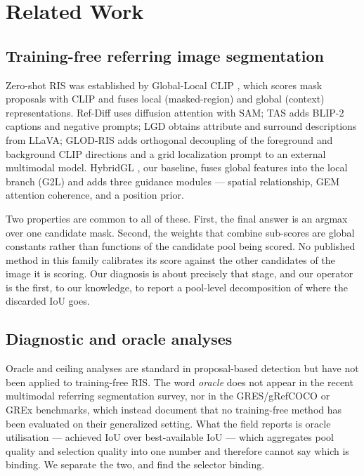 \section{Related Work}

\subsection{Training-free referring image segmentation}

Zero-shot RIS was established by Global-Local CLIP \cite{yu2023global}, which
scores mask proposals with CLIP and fuses local (masked-region) and global
(context) representations. Ref-Diff \cite{kim2023refdiff} uses diffusion
attention with SAM; TAS \cite{li2023tas} adds BLIP-2 captions and negative
prompts; LGD \cite{li2025lgd} obtains attribute and surround descriptions from
LLaVA; GLOD-RIS \cite{wu2026glodris} adds orthogonal decoupling of the
foreground and background CLIP directions and a grid localization prompt to an
external multimodal model. HybridGL \cite{liu2025hybridgl}, our baseline,
fuses global features into the local branch (G2L) and adds three guidance
modules --- spatial relationship, GEM attention coherence, and a position
prior.

Two properties are common to all of these. First, the final answer is an
argmax over one candidate mask. Second, the weights that combine sub-scores are
global constants rather than functions of the candidate pool being scored. No
published method in this family calibrates its score against the other
candidates of the image it is scoring. Our diagnosis is about precisely that
stage, and our operator is the first, to our knowledge, to report a
pool-level decomposition of where the discarded IoU goes.

\subsection{Diagnostic and oracle analyses}

Oracle and ceiling analyses are standard in proposal-based detection
\cite{ren2015faster,he2017maskrcnn} but have not been applied to training-free
RIS. The word \emph{oracle} does not appear in the recent multimodal referring
segmentation survey, nor in the GRES/gRefCOCO \cite{liu2023gres} or GREx
\cite{liu2025grex} benchmarks, which instead document that no training-free
method has been evaluated on their generalized setting. What the field reports
is oracle utilisation --- achieved IoU over best-available IoU --- which
aggregates pool quality and selection quality into one number and therefore
cannot say which is binding. We separate the two, and find the selector
binding.

